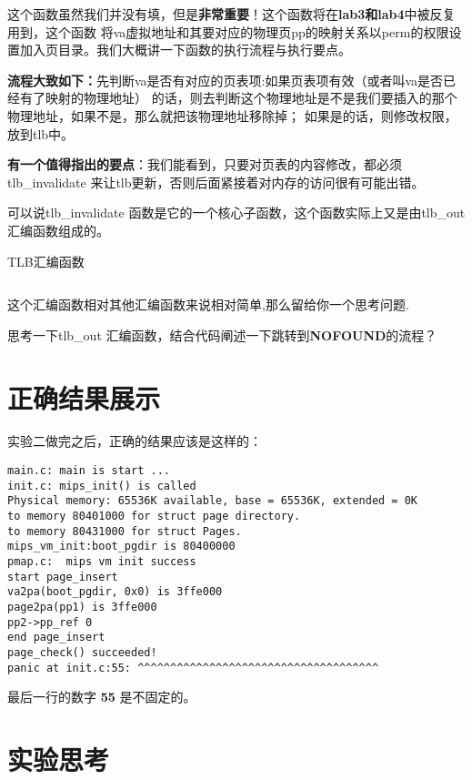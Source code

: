 这个函数虽然我们并没有填，但是\textbf{非常重要}！这个函数将在\textbf{lab3和lab4}中被反复用到，这个函数
将va虚拟地址和其要对应的物理页pp的映射关系以perm的权限设置加入页目录。我们大概讲一下函数的执行流程与执行要点。

\textbf{流程大致如下：}先判断va是否有对应的页表项:如果页表项有效（或者叫va是否已经有了映射的物理地址）
的话，则去判断这个物理地址是不是我们要插入的那个物理地址，如果不是，那么就把该物理地址移除掉；
如果是的话，则修改权限，放到tlb中。

\textbf{有一个值得指出的要点}：我们能看到，只要对页表的内容修改，都必须tlb\_invalidate 来让tlb更新，否则后面紧接着对内存的访问很有可能出错。

可以说tlb\_invalidate 函数是它的一个核心子函数，这个函数实际上又是由tlb\_out 汇编函数组成的。

\begin{codeBoxWithCaption}{TLB汇编函数\label{code:tlb_out.S}}
  \inputminted[linenos]{gas}{codes/tlb_out.S}
\end{codeBoxWithCaption}

这个汇编函数相对其他汇编函数来说相对简单,那么留给你一个思考问题.

\begin{thinking}\label{think-tlb}
思考一下tlb\_out 汇编函数，结合代码阐述一下跳转到\textbf{NOFOUND}的流程？
\end{thinking}

\section{正确结果展示}

实验二做完之后，正确的结果应该是这样的：

\begin{verbatim}
main.c: main is start ...
init.c: mips_init() is called
Physical memory: 65536K available, base = 65536K, extended = 0K
to memory 80401000 for struct page directory.
to memory 80431000 for struct Pages.
mips_vm_init:boot_pgdir is 80400000
pmap.c:  mips vm init success
start page_insert
va2pa(boot_pgdir, 0x0) is 3ffe000
page2pa(pp1) is 3ffe000
pp2->pp_ref 0
end page_insert
page_check() succeeded!
panic at init.c:55: ^^^^^^^^^^^^^^^^^^^^^^^^^^^^^^^^^^^^^
\end{verbatim}

最后一行的数字 \textbf{55} 是不固定的。

\section{实验思考}

